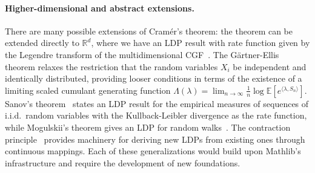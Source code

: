 \documentclass{article}
\newcommand{\E}{\mathbb{E}}
\newcommand{\R}{\mathbb{R}}
\begin{document}
\paragraph{Higher-dimensional and abstract extensions.}
There are many possible extensions of Cram{\'e}r's theorem: the theorem can be extended directly
to $\R^d$, where we have an LDP result with rate function given by the Legendre transform of the
multidimensional CGF~\cite{dembo1998large}. The G{\"a}rtner-Ellis theorem \cite{ellis1985} relaxes
the restriction that the random variables $X_i$ be independent and identically distributed,
providing looser conditions in terms of the existence of a limiting scaled cumulant generating
function
$\Lambda(\lambda) = \lim_{n \to \infty} \frac{1}{n} \log \E[e^{\langle \lambda, S_n \rangle}]$.
Sanov's theorem~\cite{dembo1998large} states an LDP result for the empirical measures of sequences of i.i.d.\ random
variables with the Kullback-Leibler divergence as the rate function, while Mogulskii's theorem gives an LDP for random walks~\cite{dembo1998large, varadhan1984}. The contraction principle~\cite{dembo1998large} provides machinery for deriving new LDPs from existing ones through continuous
mappings. Each of these generalizations would build upon Mathlib's infrastructure and require the
development of new foundations.

\end{document}
